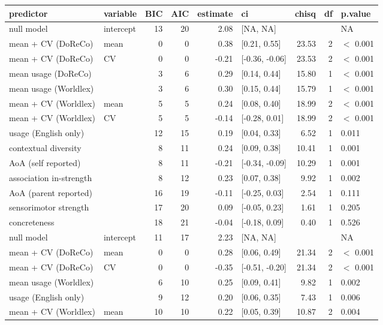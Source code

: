 \begin{table}[ht]
\centering
\begin{tabular}{llrrrlrrl}
  \hline
predictor & variable & BIC & AIC & estimate & ci & chisq & df & p.value \\ 
  \hline
null model & intercept & 13 & 20 & 2.08 & [NA, NA] &  &  & NA \\ 
  mean + CV (DoReCo) & mean & 0 & 0 & 0.38 & [0.21, 0.55] & 23.53 & 2 & $<$ 0.001 \\ 
  mean + CV (DoReCo) & CV & 0 & 0 & -0.21 & [-0.36, -0.06] & 23.53 & 2 & $<$ 0.001 \\ 
  mean usage (DoReCo) &  & 3 & 6 & 0.29 & [0.14, 0.44] & 15.80 & 1 & $<$ 0.001 \\ 
  mean usage (Worldlex) &  & 3 & 6 & 0.30 & [0.15, 0.44] & 15.79 & 1 & $<$ 0.001 \\ 
  mean + CV (Worldlex) & mean & 5 & 5 & 0.24 & [0.08, 0.40] & 18.99 & 2 & $<$ 0.001 \\ 
  mean + CV (Worldlex) & CV & 5 & 5 & -0.14 & [-0.28, 0.01] & 18.99 & 2 & $<$ 0.001 \\ 
  usage (English only) &  & 12 & 15 & 0.19 & [0.04, 0.33] & 6.52 & 1 & 0.011 \\ 
  contextual diversity &  & 8 & 11 & 0.24 & [0.09, 0.38] & 10.41 & 1 & 0.001 \\ 
  AoA (self reported) &  & 8 & 11 & -0.21 & [-0.34, -0.09] & 10.29 & 1 & 0.001 \\ 
  association in-strength &  & 8 & 12 & 0.23 & [0.07, 0.38] & 9.92 & 1 & 0.002 \\ 
  AoA (parent reported) &  & 16 & 19 & -0.11 & [-0.25, 0.03] & 2.54 & 1 & 0.111 \\ 
  sensorimotor strength &  & 17 & 20 & 0.09 & [-0.05, 0.23] & 1.61 & 1 & 0.205 \\ 
  concreteness &  & 18 & 21 & -0.04 & [-0.18, 0.09] & 0.40 & 1 & 0.526 \\ 
  null model & intercept & 11 & 17 & 2.23 & [NA, NA] &  &  & NA \\ 
  mean + CV (DoReCo) & mean & 0 & 0 & 0.28 & [0.06, 0.49] & 21.34 & 2 & $<$ 0.001 \\ 
  mean + CV (DoReCo) & CV & 0 & 0 & -0.35 & [-0.51, -0.20] & 21.34 & 2 & $<$ 0.001 \\ 
  mean usage (Worldlex) &  & 6 & 10 & 0.25 & [0.09, 0.41] & 9.82 & 1 & 0.002 \\ 
  usage (English only) &  & 9 & 12 & 0.20 & [0.06, 0.35] & 7.43 & 1 & 0.006 \\ 
  mean + CV (Worldlex) & mean & 10 & 10 & 0.22 & [0.05, 0.39] & 10.87 & 2 & 0.004 \\ 

\end{tabular}
\end{table}
